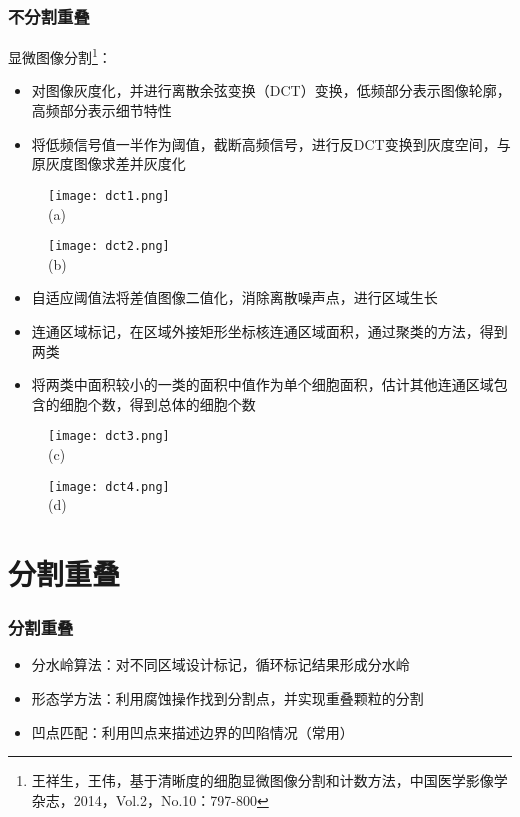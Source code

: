 \documentclass[notheorems,mathserif,table,compress]{beamer}  %
\begin{document}
\begin{frame}
    \frametitle{不分割重叠}
    显微图像分割\footnote{王祥生，王伟，基于清晰度的细胞显微图像分割和计数方法，中国医学影像学杂志，2014，Vol.2，No.10：797-800}：
    \begin{itemize}
        \item 对图像灰度化，并进行离散余弦变换（DCT）变换，低频部分表示图像轮廓，高频部分表示细节特性
     	\item 将低频信号值一半作为阈值，截断高频信号，进行反DCT变换到灰度空间，与原灰度图像求差并灰度化
    \end{itemize}
     \begin{figure}
     \begin{minipage}[b]{0.4\textwidth} 
     \centering 
     \texttt{[image: dct1.png]} \\
     (a)
   \end{minipage}
   \begin{minipage}[b]{0.4\textwidth} 
     \centering 
     \texttt{[image: dct2.png]} \\
     (b)
   \end{minipage}
   \end{figure}
\end{frame}

\begin{frame}
    \begin{itemize}
    	\item 自适应阈值法将差值图像二值化，消除离散噪声点，进行区域生长
    	\item 连通区域标记，在区域外接矩形坐标核连通区域面积，通过聚类的方法，得到两类
    	\item 将两类中面积较小的一类的面积中值作为单个细胞面积，估计其他连通区域包含的细胞个数，得到总体的细胞个数
    \end{itemize}
     \begin{figure}
     \begin{minipage}[b]{0.4\textwidth} 
     \centering 
     \texttt{[image: dct3.png]} \\
     (c)
   \end{minipage}
   \begin{minipage}[b]{0.4\textwidth} 
     \centering 
     \texttt{[image: dct4.png]} \\
     (d)
   \end{minipage}
   \end{figure}
\end{frame}

\section{分割重叠}
\begin{frame}
    \frametitle{分割重叠}
    \begin{itemize}
        \item 分水岭算法：对不同区域设计标记，循环标记结果形成分水岭
        \item 形态学方法：利用腐蚀操作找到分割点，并实现重叠颗粒的分割
        \item 凹点匹配：利用凹点来描述边界的凹陷情况（常用）
    \end{itemize}
\end{frame}
\end{document}
